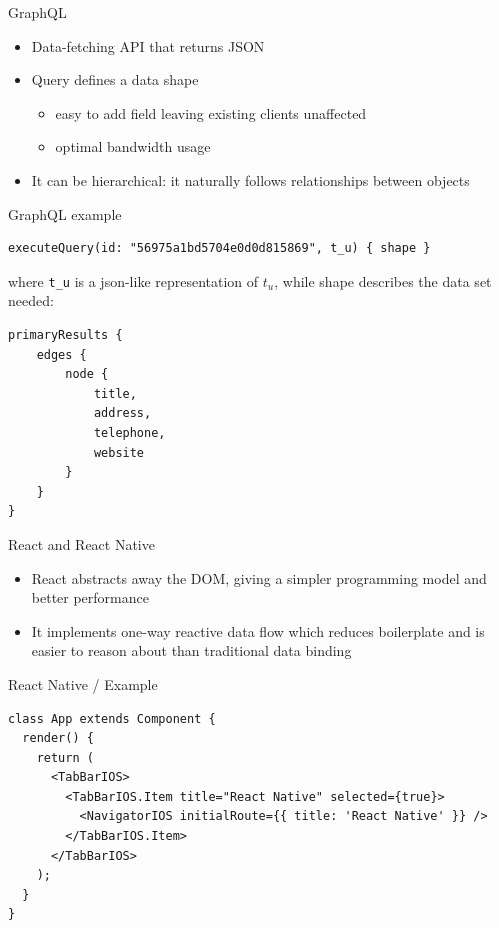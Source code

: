\documentclass[smaller]{beamer}
\begin{document}
\begin{frame}[label={sec:orgheadline20}]{GraphQL}
\begin{itemize}
\item Data-fetching API that returns JSON
\item Query defines a data shape
\begin{itemize}
\item easy to add field leaving existing clients unaffected
\item optimal bandwidth usage
\end{itemize}
\item It can be hierarchical: it naturally follows relationships between objects
\end{itemize}
\end{frame}

\begin{frame}[fragile,label={sec:orgheadline21}]{GraphQL example}
 \begin{verbatim}
executeQuery(id: "56975a1bd5704e0d0d815869", t_u) { shape }
\end{verbatim}

where \texttt{t\_u} is a json-like representation of \(t_u\), while 
\alert{shape} describes the data set needed:


\begin{verbatim}
primaryResults {
    edges {
        node {
            title,
            address,
            telephone,
            website
        }
    }
}
\end{verbatim}
\end{frame}

\begin{frame}[label={sec:orgheadline22}]{React and React Native}
\begin{itemize}
\item React abstracts away the DOM, giving a simpler programming model and better performance

\item It implements one-way reactive data flow which reduces boilerplate and is easier to reason about than traditional data binding
\end{itemize}
\end{frame}

\begin{frame}[fragile,label={sec:orgheadline23}]{React Native / Example}
 \begin{verbatim}
class App extends Component {
  render() {
    return (
      <TabBarIOS>
        <TabBarIOS.Item title="React Native" selected={true}>
          <NavigatorIOS initialRoute={{ title: 'React Native' }} />
        </TabBarIOS.Item>
      </TabBarIOS>
    );
  }
}
\end{verbatim}
\end{frame}
\end{document}
